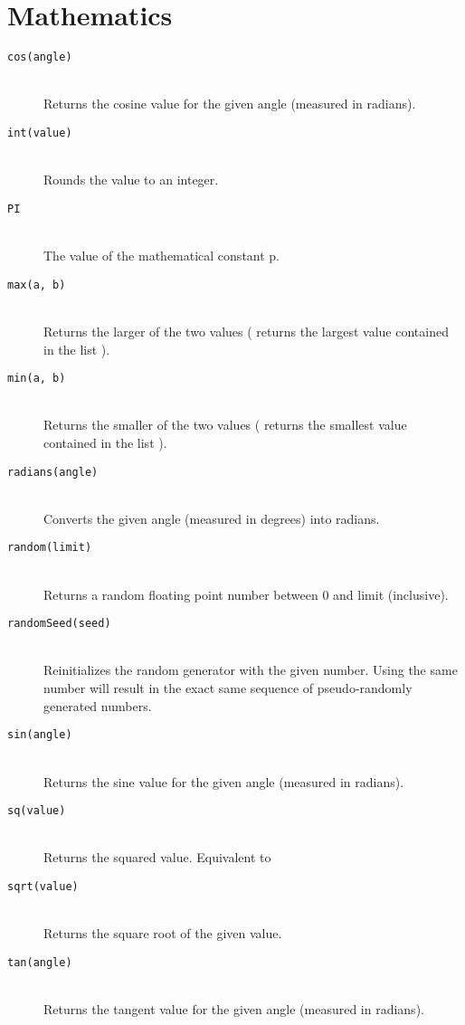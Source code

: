 \section{Mathematics}
\begin{description}
\item[\texttt{cos(angle)}] \hfill \\
	Returns the cosine value for the given angle (measured in radians).
\item[\texttt{int(value)}] \hfill \\
	Rounds the value to an integer.
\item[\texttt{PI}] \hfill \\
	The value of the mathematical constant p.
\item[\texttt{max(a, b)}] \hfill \\
	Returns the larger of the two values ( returns the largest value contained in the list ).
\item[\texttt{min(a, b)}] \hfill \\
	Returns the smaller of the two values ( returns the smallest value contained in the list ).
\item[\texttt{radians(angle)}] \hfill \\
	Converts the given angle (measured in degrees) into radians.
\item[\texttt{random(limit)}] \hfill \\
	Returns a random floating point number between 0 and limit (inclusive).
\item[\texttt{randomSeed(seed)}] \hfill \\
	Reinitializes the random generator with the given  number. Using the same number will result in the exact same sequence of pseudo-randomly generated numbers.
\item[\texttt{sin(angle)}] \hfill \\
	Returns the sine value for the given angle (measured in radians).
\item[\texttt{sq(value)}] \hfill \\
	Returns the squared value. Equivalent to 
\item[\texttt{sqrt(value)}] \hfill \\
	Returns the square root of the given value.
\item[\texttt{tan(angle)}] \hfill \\
	Returns the tangent value for the given angle (measured in radians).
\end{description}

